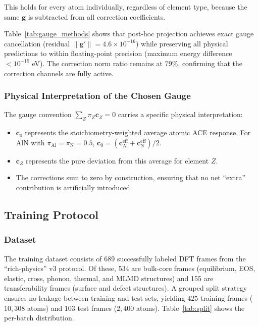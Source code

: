 \documentclass[twoside,prb,aps,floatfix,superscriptaddress,longbibliography]{revtex4-2}
\begin{document}
This holds for every atom individually, regardless of element type, because the same $\mathbf{g}$ is subtracted from all correction coefficients.

Table~\ref{tab:gauge_methods} shows that post-hoc projection achieves exact gauge cancellation (residual $\lVert\mathbf{g}'\rVert = 4.6 \times 10^{-16}$) while preserving all physical predictions to within floating-point precision (maximum energy difference $< 10^{-15}$ eV). The correction norm ratio remains at $79\%$, confirming that the correction channels are fully active.

\subsubsection{Physical Interpretation of the Chosen Gauge}

The gauge convention $\sum_Z \pi_Z \mathbf{c}_Z = 0$ carries a specific physical interpretation:
\begin{itemize}
    \item $\mathbf{c}_0$ represents the stoichiometry-weighted average atomic ACE response. For AlN with $\pi_{\mathrm{Al}} = \pi_{\mathrm{N}} = 0.5$, $\mathbf{c}_0 = (\mathbf{c}_{\mathrm{Al}}^{\mathrm{eff}} + \mathbf{c}_{\mathrm{N}}^{\mathrm{eff}})/2$.
    \item $\mathbf{c}_Z$ represents the pure deviation from this average for element $Z$.
    \item The corrections sum to zero by construction, ensuring that no net ``extra'' contribution is artificially introduced.
\end{itemize}

\subsection{Training Protocol}
\label{sec:training}

\subsubsection{Dataset}

The training dataset consists of 689 successfully labeled DFT frames from the ``rich-physics'' v3 protocol. Of these, 534 are bulk-core frames (equilibrium, EOS, elastic, cross, phonon, thermal, and MLMD structures) and 155 are transferability frames (surface and defect structures). A grouped split strategy ensures no leakage between training and test sets, yielding $425$ training frames ($10{,}308$ atoms) and $103$ test frames ($2{,}400$ atoms). Table~\ref{tab:split} shows the per-batch distribution.
\end{document}
